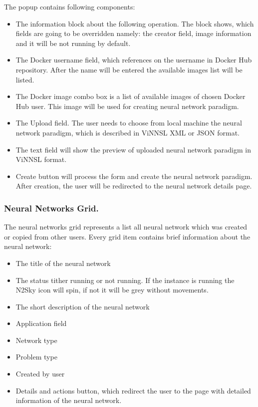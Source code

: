 \begin{itemize}
The popup contains following components:
\begin{itemize}
\item The information block about the following operation. The block shows, which fields are going to be overridden namely: the creator field, image information and it will be not running by default. 
\item The Docker username field, which references on the username in Docker Hub repository. After the name will be entered the available images list will be listed. 
\item The Docker image combo box is a list of available images of chosen Docker Hub user.  This image will be used for creating neural network paradigm.
\item The Upload field. The user needs to choose from local machine the neural network paradigm, which is described in ViNNSL XML or JSON format.
\item The text field will show the preview of uploaded neural network paradigm in ViNNSL format.
\item Create button will process the form and create the neural network paradigm. After creation, the user will be redirected to the neural network details page. 
\end{itemize}

\subsubsection{Neural Networks Grid.}

The neural networks grid represents a list all neural network which was created or copied from other users. Every grid item contains brief information about the neural network:
\begin{itemize}
\item The title of the neural network
\item The status tither running or not running. If the instance is running the N2Sky icon will spin, if not it will be grey without movements. 
\item The short description of the neural network
\item Application field
\item Network type
\item Problem type
\item Created by user
\item Details and actions button, which redirect the user to the page with detailed information of the neural network. 
\end{itemize}


\end{itemize}

